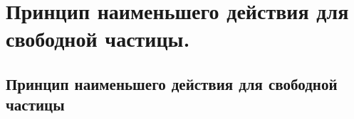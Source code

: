 \chapter{Принцип наименьшего действия для свободной частицы.}

\section{Принцип наименьшего действия для свободной частицы}
